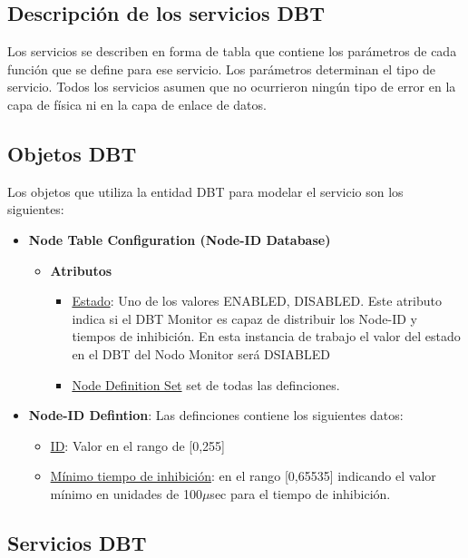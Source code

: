 \subsection{Descripción de los servicios DBT}
Los servicios se describen en forma de tabla que contiene los parámetros de
cada función que se define para ese servicio. Los parámetros determinan el tipo
de servicio.  Todos los servicios asumen que no ocurrieron ningún tipo de error
en la capa de física ni en la capa de enlace de datos.

\subsection{Objetos DBT}
Los objetos que utiliza la entidad DBT para modelar el servicio son los
siguientes:
\begin{itemize}
\item \textbf{Node Table Configuration (Node-ID Database)}
  \begin{itemize}
  \item \textbf{Atributos}
    \begin{itemize}
    \item \underline{Estado}: Uno de los valores {ENABLED, DISABLED}. Este
      atributo indica si el DBT Monitor es capaz de distribuir los Node-ID
      y tiempos de inhibición. En esta instancia de trabajo el valor del estado
      en el DBT del Nodo Monitor será DSIABLED
      \item \underline{Node Definition Set} set de todas las definciones. 
    \end{itemize}
  \end{itemize}

\item \textbf{Node-ID Defintion}:
  Las definciones contiene los siguientes datos:
  \begin{itemize}
  \item \underline{ID}: Valor en el rango de [0,255]
  \item \underline{Mínimo tiempo de inhibición}: en el rango [0,65535] indicando
    el valor mínimo en unidades de 100$\mu$sec para el tiempo de inhibición.
  \end{itemize}
  
\end{itemize}

\subsection{Servicios DBT}\label{subsection:servicios_dbt}
